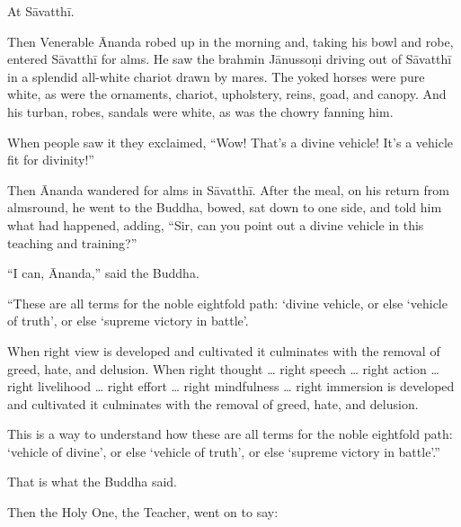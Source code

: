 \documentclass[12pt,openany]{book}%
\begin{document}
At \textsanskrit{Sāvatthī}. 

Then Venerable Ānanda robed up in the morning and, taking his bowl and robe, entered \textsanskrit{Sāvatthī} for alms. He saw the brahmin \textsanskrit{Jānussoṇi} driving out of \textsanskrit{Sāvatthī} in a splendid all-white chariot drawn by mares. The yoked horses were pure white, as were the ornaments, chariot, upholstery, reins, goad, and canopy. And his turban, robes, sandals were white, as was the chowry fanning him. 

When people saw it they exclaimed, “Wow! That’s a divine vehicle! It’s a vehicle fit for divinity!” 

Then Ānanda wandered for alms in \textsanskrit{Sāvatthī}. After the meal, on his return from almsround, he went to the Buddha, bowed, sat down to one side, and told him what had happened, adding, “Sir, can you point out a divine vehicle in this teaching and training?” 

“I can, Ānanda,” said the Buddha. 

“These are all terms for the noble eightfold path: ‘divine vehicle, or else ‘vehicle of truth’, or else ‘supreme victory in battle’. 

When right view is developed and cultivated it culminates with the removal of greed, hate, and delusion. When right thought … right speech … right action … right livelihood … right effort … right mindfulness … right immersion is developed and cultivated it culminates with the removal of greed, hate, and delusion. 

This is a way to understand how these are all terms for the noble eightfold path: ‘vehicle of divine’, or else ‘vehicle of truth’, or else ‘supreme victory in battle’.” 

That is what the Buddha said. 

Then the Holy One, the Teacher, went on to say: 
\end{document}
